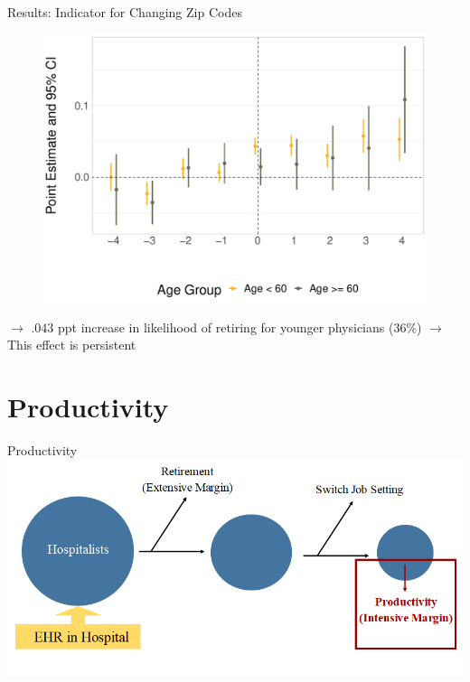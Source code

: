 \documentclass[10pt]{beamer}
\begin{document}
\begin{frame}{Results: Indicator for Changing Zip Codes}
\begin{figure}[ht]
    \centering
    \includegraphics[scale=.35]{Objects/Presentation_zip_ages.pdf}
\end{figure}
$\rightarrow$ .043 ppt increase in likelihood of retiring for younger physicians (36\%)
$\rightarrow$ This effect is persistent
\end{frame}





\section{Productivity}





\begin{frame}{Productivity}
\centering
\includegraphics[scale=.45]{Objects/EHR_FlowChart_Productivity.PNG}
\end{frame}
\end{document}
